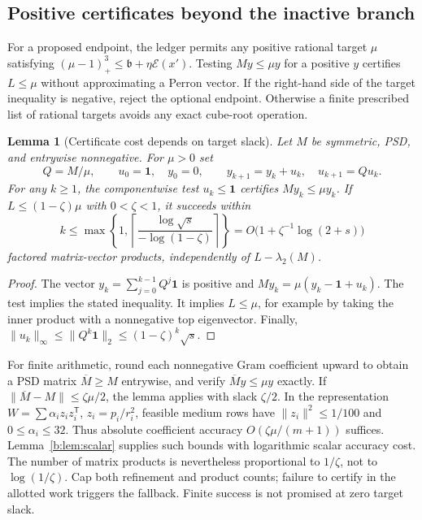 \documentclass[11pt]{amsart}
\newtheorem{lemma}[theorem]{Lemma}
\theoremstyle{definition}\newtheorem{definition}[theorem]{Definition}
\theoremstyle{remark}\newtheorem{remark}[theorem]{Remark}
\numberwithin{equation}{section}
\newcommand{\one}{\mathbf1}
\newcommand{\T}{\mathsf T}
\begin{document}
\subsection{Positive certificates beyond the inactive branch}
\label{ep:positive}
For a proposed endpoint, the ledger permits any positive rational
target $\mu$ satisfying
$(\mu-1)_+^3\le\mathfrak b+\eta\mathcal E(x')$.
Testing $My\le\mu y$ for a positive $y$ certifies $L\le\mu$ without
approximating a Perron vector. If the right-hand side of the target
inequality is negative, reject the optional endpoint. Otherwise a
finite prescribed list of rational targets avoids any exact cube-root
operation.

\begin{lemma}[Certificate cost depends on target slack]\label{ep:series}
Let $M$ be symmetric, PSD, and entrywise nonnegative. For $\mu>0$ set
\[
 Q=M/\mu,\qquad u_0=\one,\quad y_0=0,\qquad
 y_{k+1}=y_k+u_k,\quad u_{k+1}=Qu_k.
\]
For any $k\ge1$, the componentwise test $u_k\le\one$ certifies
$My_k\le\mu y_k$. If $L\le(1-\zeta)\mu$ with $0<\zeta<1$, it
succeeds within
\begin{equation}\label{ep:series-cost}
 k\le\max\left\{1,
 \left\lceil\frac{\log\sqrt s}{-\log(1-\zeta)}\right\rceil\right\}
 =O\bigl(1+\zeta^{-1}\log(2+s)\bigr)
\end{equation}
factored matrix-vector products, independently of $L-\lambda_2(M)$.
\end{lemma}
\begin{proof}
The vector $y_k=\sum_{j=0}^{k-1}Q^j\one$ is positive and
$My_k=\mu(y_k-\one+u_k)$. The test implies the stated inequality.
It implies $L\le\mu$, for example by taking the inner product with a
nonnegative top eigenvector. Finally,
$\|u_k\|_\infty\le\|Q^k\one\|_2\le(1-\zeta)^k\sqrt s$.
\end{proof}

For finite arithmetic, round each nonnegative Gram coefficient upward
to obtain a PSD matrix $\overline M\ge M$ entrywise, and verify
$\overline My\le\mu y$ exactly. If
$\|\overline M-M\|\le\zeta\mu/2$, the lemma applies with slack
$\zeta/2$. In the representation
$W=\sum\alpha_i z_i z_i^\T$, $z_i=p_i/r_i^2$, feasible medium rows
have $\|z_i\|^2\le1/100$ and $0\le\alpha_i\le32$.
Thus absolute coefficient accuracy $O(\zeta\mu/(m+1))$ suffices.
Lemma~\ref{b:lem:scalar} supplies such bounds with logarithmic scalar
accuracy cost. The number of matrix products is nevertheless
proportional to $1/\zeta$, not to $\log(1/\zeta)$.
Cap both refinement and product counts; failure to certify in the
allotted work triggers the fallback. Finite success is not promised
at zero target slack.
\end{document}
